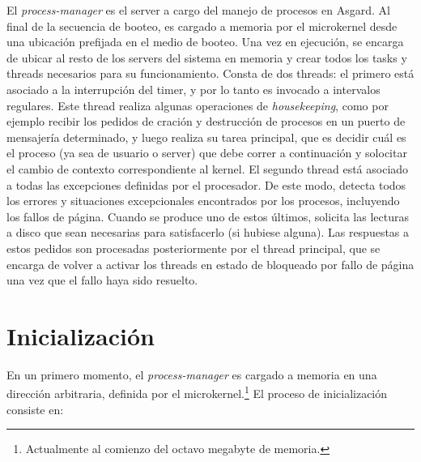 \documentclass[11pt, letterpaper, twoside]{book}
\begin{document}
El \emph{process-manager} es el server a cargo del manejo de procesos en Asgard. Al final de la secuencia de booteo, es cargado a memoria por el microkernel desde una ubicaci\'on prefijada en el medio de booteo. Una vez en ejecuci\'on, se encarga de ubicar al resto de los servers del sistema en memoria y crear todos los tasks y threads necesarios para su funcionamiento. Consta de dos threads: el primero est\'a asociado a la interrupci\'on del timer, y por lo tanto es invocado a intervalos regulares. Este thread realiza algunas operaciones de \emph{housekeeping}, como por ejemplo recibir los pedidos de craci\'on y destrucci\'on de procesos en un puerto de mensajer\'ia determinado, y luego realiza su tarea principal, que es decidir cu\'al es el proceso (ya sea de usuario o server) que debe correr a continuaci\'on y solocitar el cambio de contexto correspondiente al kernel. El segundo thread est\'a asociado a todas las excepciones definidas por el procesador. De este modo, detecta todos los errores y situaciones excepcionales encontrados por los procesos, incluyendo los fallos de p\'agina. Cuando se produce uno de estos \'ultimos, solicita las lecturas a disco que sean necesarias para satisfacerlo (si hubiese alguna). Las respuestas a estos pedidos son procesadas posteriormente por el thread principal, que se encarga de volver a activar los threads en estado de bloqueado por fallo de p\'agina una vez que el fallo haya sido resuelto. 

\section{Inicializaci\'on}

En un primero momento, el \emph{process-manager} es cargado a memoria en una direcci\'on arbitraria, definida por el microkernel.\footnote{Actualmente al comienzo del octavo megabyte de memoria.} El proceso de inicializaci\'on consiste en:
\end{document}
